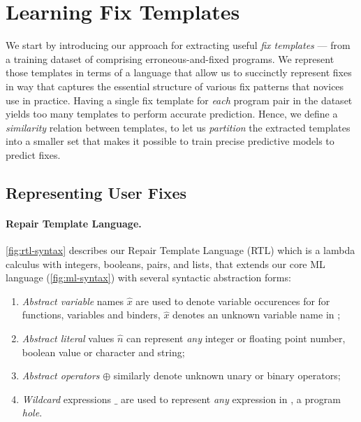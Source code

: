 \section{Learning Fix Templates}
\label{sec:templ-cluster}

We start by introducing our approach for extracting useful \emph{fix templates}
--- from a training dataset of comprising erroneous-and-fixed programs.
%
We represent those templates in terms of a language that allow us to succinctly
represent fixes in way that captures the essential structure of various fix
patterns that novices use in practice.
%
Having a single fix template for \emph{each} program pair in the dataset yields
too many templates to perform accurate prediction.
%
Hence, we define a \emph{similarity} relation between templates, to let us
\emph{partition} the extracted templates into a smaller set that makes it
possible to train precise predictive models to predict fixes.



\subsection{Representing User Fixes}
\label{sec:templ-cluster:lang}

\paragraph{Repair Template Language.}
\autoref{fig:rtl-syntax} describes our Repair Template Language (RTL) which is a
lambda calculus with integers, booleans, pairs, and lists, that extends our core
ML language \lang (\autoref{fig:ml-syntax}) with several syntactic abstraction
forms:

\begin{enumerate}
    \item \emph{Abstract variable} names $\hat{x}$  are used to denote variable
    occurences for for functions, variables and binders, \ie $\hat{x}$ denotes
    an unknown variable name in \repairLang;

    \item \emph{Abstract literal} values $\hat{n}$ can represent \emph{any}
    integer or floating point number, boolean value or character and string;

    \item \emph{Abstract operators} $\oplus$ similarly denote unknown unary or
    binary operators;

    \item \emph{Wildcard} expressions $\_$ are used to represent \emph{any}
    expression in \repairLang, \ie a program \emph{hole}.
\end{enumerate}

